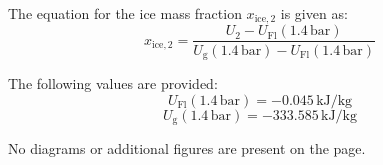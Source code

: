 The equation for the ice mass fraction \( x_{\text{ice},2} \) is given as:  
\[
x_{\text{ice},2} = \frac{U_2 - U_{\text{Fl}}(1.4 \, \text{bar})}{U_{\text{g}}(1.4 \, \text{bar}) - U_{\text{Fl}}(1.4 \, \text{bar})}
\]  

The following values are provided:  
\[
U_{\text{Fl}}(1.4 \, \text{bar}) = -0.045 \, \text{kJ/kg}
\]  
\[
U_{\text{g}}(1.4 \, \text{bar}) = -333.585 \, \text{kJ/kg}
\]  

No diagrams or additional figures are present on the page.